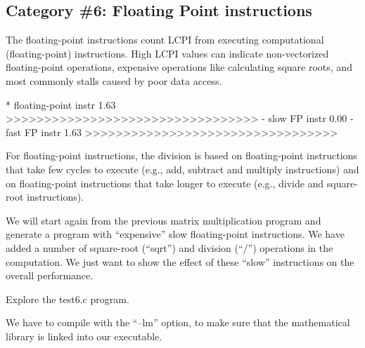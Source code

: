 \subsection{Category \#6: Floating Point instructions}
\label{subsec:CAT6_FP_Instructions}

The floating-point instructions count LCPI from executing computational (floating-point) instructions. High LCPI values can indicate non-vectorized floating-point operations, expensive operations like calculating square roots, and most commonly stalls caused by poor data access.

\begin{prompt}
* floating-point instr  1.63 >>>>>>>>>>>>>>>>>>>>>>>>>>>>>>>>>
 - slow FP instr        0.00
 - fast FP instr        1.63 >>>>>>>>>>>>>>>>>>>>>>>>>>>>>>>>>
\end{prompt}

For floating-point instructions, the division is based on floating-point instructions that take few cycles to execute (e.g., add, subtract and multiply instructions) and on floating-point instructions that take longer to execute (e.g., divide and square-root instructions).

We will start again from the previous matrix multiplication program and generate a program with ``expensive'' slow floating-point instructions. We have added a number of square-root (``sqrt'') and division (``/'') operations in the computation. We just want to show the effect of these ``slow'' instructions on the overall performance.

Explore the test6.c program.

\begin{prompt}
\end{prompt}

We have to compile with the ``--lm'' option, to make sure that the mathematical library is linked into our executable.

